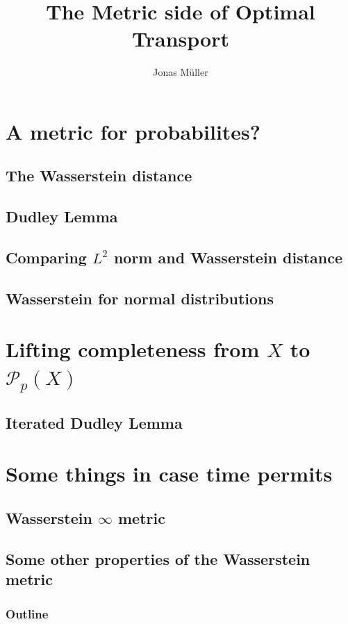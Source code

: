 \documentclass[10pt]{beamer}
\author[Jonas Müller]{Jonas Müller}
\theoremstyle{reminder}
\begin{document}
\title[Wasserstein Metric]{The Metric side of Optimal Transport}
\institute{}
\date{}

\begin{frame}
    \titlepage
\end{frame}

\section{A metric for probabilites?}
\subsection{The Wasserstein distance}
\subsection{Dudley Lemma}
\subsection{Comparing $L^2$ norm and Wasserstein distance}
\subsection{Wasserstein for normal distributions}

\section{Lifting completeness from $X$ to $\mathcal{P}_p(X)$}
\subsection{Iterated Dudley Lemma}
\section{Some things in case time permits}
\subsection{Wasserstein $\infty$ metric}
\subsection{Some other properties of the Wasserstein metric}
\begin{frame}
    \frametitle{Outline}
    \tableofcontents
\end{frame}
\end{document}
